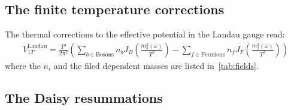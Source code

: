\documentclass[12pt]{article}
\begin{document}
\subsection{The finite temperature corrections}

The thermal corrections to the effective potential in the Landau gauge read:
\begin{align}
    V_{1T}^{\text{Landau}} = \frac{T^4}{2\pi^2}\left(\sum_{b\in\text{Bosons}}n_b J_B\left(\frac{m_b^2(\omega)}{T^2}\right)-\sum_{f\in\text{Fermions}}n_fJ_F\left(\frac{m_f^2(\omega)}{T^2}\right)\right)
\end{align}
where the $n_i$ and the filed dependent masses are listed in~\autoref{tab:fields}.

\subsection{The Daisy resummations}
\end{document}
